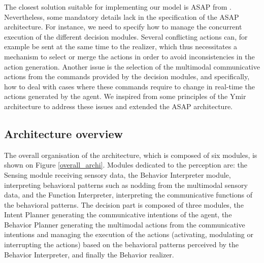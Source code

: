 The closest solution suitable for implementing our model is ASAP from \cite{kopp_architecture_2014}.
Nevertheless, some mandatory details lack in the specification of the ASAP architecture. For instance, we need to specify how to manage the concurrent execution of the different decision modules. Several conflicting actions can, for example be sent at the same time to the realizer, which thus necessitates a mechanism to select or merge the actions in order to avoid inconsistencies in the action generation. Another issue is the selection of the multimodal communicative actions from the commands provided by the decision modules, and specifically, how to deal with cases where these commands require to change in real-time the actions generated by the agent. 
We inspired from some principles of the Ymir architecture to address these issues and extended the ASAP architecture.  

\subsection{Architecture overview}

The overall organisation of the architecture, which is composed of six modules, is shown on Figure \ref{overall_archi}. 
Modules dedicated to the perception are: 
the Sensing module receiving sensory data, 
the Behavior Interpreter module, interpreting behavioral patterns such as nodding from the multimodal sensory data, 
and the Function Interpreter, interpreting the communicative functions of the behavioral patterns. 
The decision part is composed of three modules, 
the Intent Planner generating the communicative intentions of the agent, 
the Behavior Planner generating the multimodal actions from the communicative intentions and managing the execution of the actions (activating, modulating or interrupting the actions) based on the behavioral patterns perceived by the Behavior Interpreter,
and finally the Behavior realizer. 

